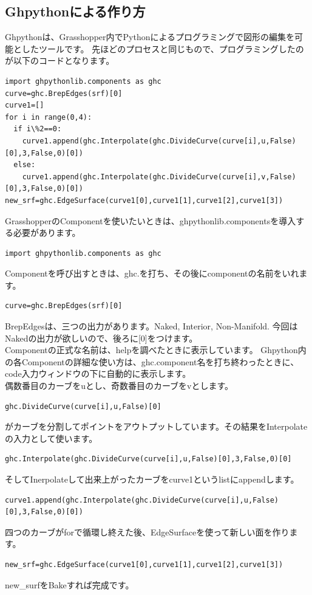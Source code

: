 \documentclass[11pt]{jarticle}
\begin{document}
\subsection{Ghpythonによる作り方}
Ghpythonは、Grasshopper内でPythonによるプログラミングで図形の編集を可能としたツールです。
先ほどのプロセスと同じもので、プログラミングしたのが以下のコードとなります。
\begin{lstlisting}[basicstyle=\ttfamily\footnotesize]
import ghpythonlib.components as ghc
curve=ghc.BrepEdges(srf)[0]
curve1=[]
for i in range(0,4):
  if i\%2==0:
    curve1.append(ghc.Interpolate(ghc.DivideCurve(curve[i],u,False)[0],3,False,0)[0])
  else:
    curve1.append(ghc.Interpolate(ghc.DivideCurve(curve[i],v,False)[0],3,False,0)[0])    
new_srf=ghc.EdgeSurface(curve1[0],curve1[1],curve1[2],curve1[3])
\end{lstlisting}            

GrasshopperのComponentを使いたいときは、ghpythonlib.componentsを導入する必要があります。
\begin{lstlisting}[basicstyle=\ttfamily\footnotesize]
import ghpythonlib.components as ghc
\end{lstlisting}  

Componentを呼び出すときは、ghc.を打ち、その後にcomponentの名前をいれます。
\begin{lstlisting}[basicstyle=\ttfamily\footnotesize]
curve=ghc.BrepEdges(srf)[0]
\end{lstlisting}    
BrepEdgesは、三つの出力があります。Naked, Interior, Non-Manifold.
今回はNakedの出力が欲しいので、後ろに[0]をつけます。\\
Componentの正式な名前は、helpを調べたときに表示しています。
Ghpython内の各Componentの詳細な使い方は、ghc.component名を打ち終わったときに、code入力ウィンドウの下に自動的に表示します。\\
偶数番目のカーブをuとし、奇数番目のカーブをvとします。\\
\begin{lstlisting}[basicstyle=\ttfamily\footnotesize]
ghc.DivideCurve(curve[i],u,False)[0]
\end{lstlisting} 
がカーブを分割してポイントをアウトプットしています。その結果をInterpolateの入力として使います。
\begin{lstlisting}[basicstyle=\ttfamily\footnotesize]
ghc.Interpolate(ghc.DivideCurve(curve[i],u,False)[0],3,False,0)[0]
\end{lstlisting} 
そしてInerpolateして出来上がったカーブをcurve1というlistにappendします。
\begin{lstlisting}[basicstyle=\ttfamily\footnotesize]
curve1.append(ghc.Interpolate(ghc.DivideCurve(curve[i],u,False)[0],3,False,0)[0])
\end{lstlisting} 
四つのカーブがforで循環し終えた後、EdgeSurfaceを使って新しい面を作ります。
\begin{lstlisting}[basicstyle=\ttfamily\footnotesize]
new_srf=ghc.EdgeSurface(curve1[0],curve1[1],curve1[2],curve1[3])
\end{lstlisting} 
new\_surfをBakeすれば完成です。
\end{document}
